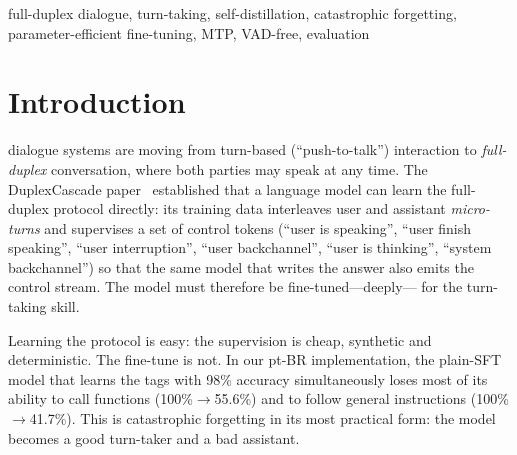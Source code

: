 \documentclass[conference]{IEEEtran}
\begin{document}
\begin{abstract}
0.858 published). All three pt-BR variants beat that published accuracy
(ATA 0.955--0.973). The comparison also exposes what teacher-forced accuracy
cannot see: the distill model, despite the best capability retention, has the
weakest interruption relevance (1.59 vs.\ 3.56 and 4.36) and commits to the floor
$13\times$ more slowly (3.29\,s vs.\ 0.25\,s), because the KL anchors the
teacher's \emph{generation style} along with its capabilities. We further show
that the evaluated input stream must match the training stream---on the same model,
one ablation arm more than triples pause-handling TOR and another destroys
interruption recovery, and the two axes are separable---and that one FDB dimension
is unanswerable on this data by construction, since the system-backchannel tag
occurs zero times in training.
\end{abstract}

\begin{IEEEkeywords}
full-duplex dialogue, turn-taking, self-distillation, catastrophic forgetting,
parameter-efficient fine-tuning, MTP, VAD-free, evaluation
\end{IEEEkeywords}

\section{Introduction}
 dialogue systems are moving from turn-based
(``push-to-talk'') interaction to \emph{full-duplex} conversation, where both
parties may speak at any time. The DuplexCascade
paper~\cite{duplexcascade} established that a language model can learn the
full-duplex protocol directly: its training data interleaves user and assistant
\emph{micro-turns} and supervises a set of control tokens (``user is speaking'',
``user finish speaking'', ``user interruption'', ``user backchannel'', ``user is
thinking'', ``system backchannel'') so that the same model that writes the answer
also emits the control stream. The model must therefore be fine-tuned---deeply---
for the turn-taking skill.

Learning the protocol is easy: the supervision is cheap, synthetic and
deterministic. The fine-tune is not. In our pt-BR implementation, the plain-SFT
model that learns the tags with 98\% accuracy simultaneously loses most of its
ability to call functions (100\%$\rightarrow$55.6\%) and to follow general
instructions (100\%$\rightarrow$41.7\%). This is catastrophic forgetting in its
most practical form: the model becomes a good turn-taker and a bad assistant.
\end{document}

